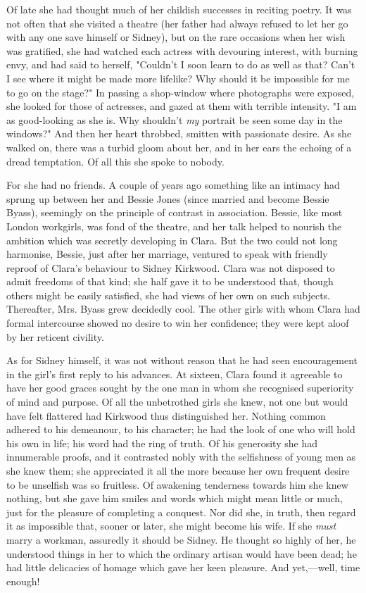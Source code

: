 Of late she had thought much of her childish successes in reciting
poetry. It was not often that she visited a theatre (her father had
always refused to let her go with any one save himself or Sidney), but
on the rare occasions when her wish was gratified, she had watched each
actress with devouring interest, with burning envy, and had said to
herself, "Couldn't {}I soon learn to do as well as that? Can't I see
where it might be made more lifelike? Why should it be impossible for me
to go on the stage?" In passing a shop-window where photographs were
exposed, she looked for those of actresses, and gazed at them with
terrible intensity. "I am as good-looking as she is. Why shouldn't
\emph{my} portrait be seen some day in the windows?" And then her heart
throbbed, smitten with passionate desire. As she walked on, there was a
turbid gloom about her, and in her ears the echoing of a dread
temptation. Of all this she spoke to nobody.

For she had no friends. A couple of years ago something like an intimacy
had sprung up between her and Bessie Jones (since married and become
Bessie Byass), seemingly on the principle of contrast in association.
Bessie, like most London workgirls, was fond of the theatre, and her
talk helped to nourish the ambition which was secretly developing in
Clara. But the two could not long harmonise, Bessie, just after her
marriage, ventured to speak with friendly reproof of Clara's {}behaviour
to Sidney Kirkwood. Clara was not disposed to admit freedoms of that
kind; she half gave it to be understood that, though others might be
easily satisfied, she had views of her own on such subjects. Thereafter,
Mrs. Byass grew decidedly cool. The other girls with whom Clara had
formal intercourse showed no desire to win her confidence; they were
kept aloof by her reticent civility.

As for Sidney himself, it was not without reason that he had seen
encouragement in the girl's first reply to his advances. At sixteen,
Clara found it agreeable to have her good graces sought by the one man
in whom she recognised superiority of mind and purpose. Of all the
unbetrothed girls she knew, not one but would have felt flattered had
Kirkwood thus distinguished her. Nothing common adhered to his
demeanour, to his character; he had the look of one who will hold his
own in life; his word had the ring of truth. Of his generosity she had
innumerable proofs, and it contrasted nobly with the selfishness of
young men as she knew them; she {}appreciated it all the more because
her own frequent desire to be unselfish was so fruitless. Of awakening
tenderness towards him she knew nothing, but she gave him smiles and
words which might mean little or much, just for the pleasure of
completing a conquest. Nor did she, in truth, then regard it as
impossible that, sooner or later, she might become his wife. If she
\emph{must} marry a workman, assuredly it should be Sidney. He thought
so highly of her, he understood things in her to which the ordinary
artisan would have been dead; he had little delicacies of homage which
gave her keen pleasure. And yet,---well, time enough!

